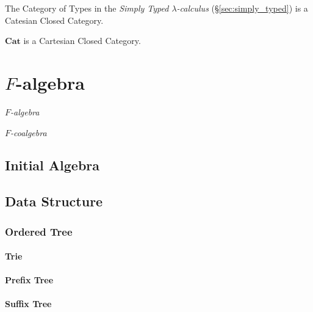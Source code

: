 The Category of Types in the \emph{Simply Typed $\lambda$-calculus}
(\S\ref{sec:simply_typed}) is a Catesian Closed Category.

$\mathbf{Cat}$ is a Cartesian Closed Category.



\section{$F$-algebra}\label{sec:f_algebra}

\emph{$F$-algebra}

\emph{$F$-coalgebra}



\subsection{Initial Algebra}\label{sec:initial_algebra}

\subsection{Data Structure}\label{sec:data_structure}

\subsubsection{Ordered Tree}\label{sec:ordered_tree}

\paragraph{Trie}\label{sec:trie}

\paragraph{Prefix Tree}\label{sec:prefix_tree}

\paragraph{Suffix Tree}\label{sec:suffix_tree}



